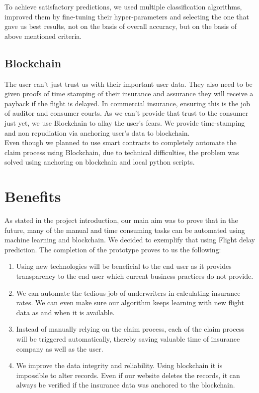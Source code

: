To achieve satisfactory predictions, we used multiple classification algorithms, improved them by fine-tuning their hyper-parameters and selecting the one that gave us best results, not on the basis of overall accuracy, but on the basis of above mentioned criteria.

\subsection{Blockchain}
The user can't just trust us with their important user data. They also need to be given proofs of time stamping of their insurance and assurance they will receive a payback if the flight is delayed. In commercial insurance, ensuring this is the job of auditor and consumer courts. As we can't provide that trust to the consumer just yet, we use Blockchain to allay the user's fears. We provide time-stamping and non repudiation via anchoring user's data to blockchain. 
\\Even though we planned to use smart contracts to completely automate the claim process using Blockchain, due to technical difficulties, the problem was solved using anchoring on blockchain and local python scripts. 


\section{Benefits}
As stated in the project introduction, our main aim was to prove that in the future, many of the manual and time consuming tasks can be automated using machine learning and blockchain. We decided to exemplify that using Flight delay prediction. The completion of the prototype proves to us the following:
\begin{enumerate}
    \item Using new technologies will be beneficial to the end user as it provides transparency to the end user which current business practices do not provide.
    \item We can automate the tedious job of underwriters in calculating insurance rates. We can even make sure our algorithm keeps learning with new flight data as and when it is available.
    \item Instead of manually relying on the claim process, each of the claim process will be triggered automatically, thereby saving valuable time of insurance company as well as the user.
    \item We improve the data integrity and reliability. Using blockchain it is impossible to alter records. Even if our website deletes the records, it can always be verified if the insurance data was anchored to the blockchain.
\end{enumerate}

